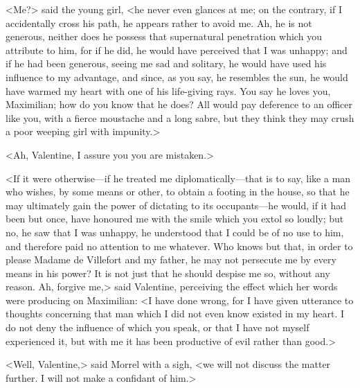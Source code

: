  <Me?> said the young girl, <he never even glances at me; on the contrary, if I accidentally cross his path, he appears rather to avoid me. Ah, he is not generous, neither does he possess that supernatural penetration which you attribute to him, for if he did, he would have perceived that I was unhappy; and if he had been generous, seeing me sad and solitary, he would have used his influence to my advantage, and since, as you say, he resembles the sun, he would have warmed my heart with one of his life-giving rays. You say he loves you, Maximilian; how do you know that he does? All would pay deference to an officer like you, with a fierce moustache and a long sabre, but they think they may crush a poor weeping girl with impunity.> 

 <Ah, Valentine, I assure you you are mistaken.> 

 <If it were otherwise—if he treated me diplomatically—that is to say, like a man who wishes, by some means or other, to obtain a footing in the house, so that he may ultimately gain the power of dictating to its occupants—he would, if it had been but once, have honoured me with the smile which you extol so loudly; but no, he saw that I was unhappy, he understood that I could be of no use to him, and therefore paid no attention to me whatever. Who knows but that, in order to please Madame de Villefort and my father, he may not persecute me by every means in his power? It is not just that he should despise me so, without any reason. Ah, forgive me,> said Valentine, perceiving the effect which her words were producing on Maximilian: <I have done wrong, for I have given utterance to thoughts concerning that man which I did not even know existed in my heart. I do not deny the influence of which you speak, or that I have not myself experienced it, but with me it has been productive of evil rather than good.> 

 <Well, Valentine,> said Morrel with a sigh, <we will not discuss the matter further. I will not make a confidant of him.> 

